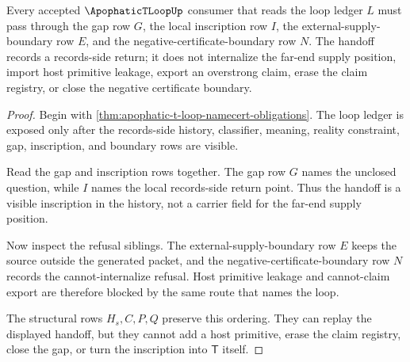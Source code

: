 \begin{theorem}
\label{thm:apophatic-t-loop-gap-inscription-handoff}
Every accepted $\ApophaticTLoopUp$ consumer that reads the loop ledger $L$ must pass through the gap row $G$, the local inscription row $I$, the external-supply-boundary row $E$, and the negative-certificate-boundary row $N$. The handoff records a records-side return; it does not internalize the far-end supply position, import host primitive leakage, export an overstrong claim, erase the claim registry, or close the negative certificate boundary.
\end{theorem}
\begin{proof}
Begin with \autoref{thm:apophatic-t-loop-namecert-obligations}. The loop ledger is exposed only after the records-side history, classifier, meaning, reality constraint, gap, inscription, and boundary rows are visible.

Read the gap and inscription rows together. The gap row $G$ names the unclosed question, while $I$ names the local records-side return point. Thus the handoff is a visible inscription in the history, not a carrier field for the far-end supply position.

Now inspect the refusal siblings. The external-supply-boundary row $E$ keeps the source outside the generated packet, and the negative-certificate-boundary row $N$ records the cannot-internalize refusal. Host primitive leakage and cannot-claim export are therefore blocked by the same route that names the loop.

The structural rows $H_s,C,P,Q$ preserve this ordering. They can replay the displayed handoff, but they cannot add a host primitive, erase the claim registry, close the gap, or turn the inscription into $\mathsf{T}$ itself.
\end{proof}



